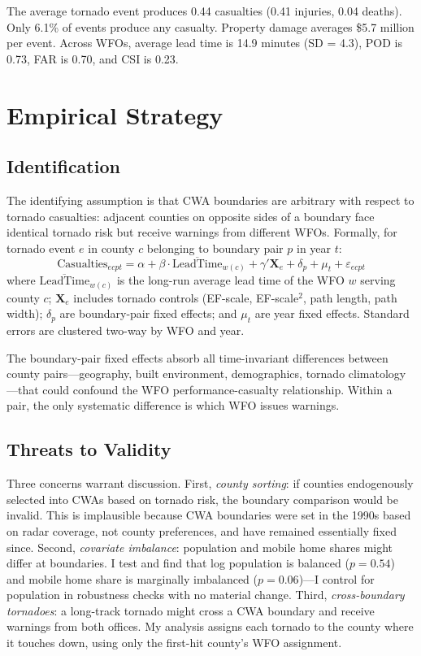 \documentclass[12pt]{article}
\begin{document}


The average tornado event produces 0.44 casualties (0.41 injuries, 0.04 deaths). Only 6.1\% of events produce any casualty. Property damage averages \$5.7 million per event. Across WFOs, average lead time is 14.9 minutes (SD = 4.3), POD is 0.73, FAR is 0.70, and CSI is 0.23.


\section{Empirical Strategy}

\subsection{Identification}

The identifying assumption is that CWA boundaries are arbitrary with respect to tornado casualties: adjacent counties on opposite sides of a boundary face identical tornado risk but receive warnings from different WFOs. Formally, for tornado event $e$ in county $c$ belonging to boundary pair $p$ in year $t$:
\begin{equation}
\text{Casualties}_{ecpt} = \alpha + \beta \cdot \overline{\text{LeadTime}}_{w(c)} + \gamma' \mathbf{X}_{e} + \delta_p + \mu_t + \varepsilon_{ecpt}
\label{eq:main}
\end{equation}
where $\overline{\text{LeadTime}}_{w(c)}$ is the long-run average lead time of the WFO $w$ serving county $c$; $\mathbf{X}_{e}$ includes tornado controls (EF-scale, EF-scale$^2$, path length, path width); $\delta_p$ are boundary-pair fixed effects; and $\mu_t$ are year fixed effects. Standard errors are clustered two-way by WFO and year.

The boundary-pair fixed effects absorb all time-invariant differences between county pairs---geography, built environment, demographics, tornado climatology---that could confound the WFO performance-casualty relationship. Within a pair, the only systematic difference is which WFO issues warnings.

\subsection{Threats to Validity}

Three concerns warrant discussion. First, \textit{county sorting}: if counties endogenously selected into CWAs based on tornado risk, the boundary comparison would be invalid. This is implausible because CWA boundaries were set in the 1990s based on radar coverage, not county preferences, and have remained essentially fixed since. Second, \textit{covariate imbalance}: population and mobile home shares might differ at boundaries. I test and find that log population is balanced ($p = 0.54$) and mobile home share is marginally imbalanced ($p = 0.06$)---I control for population in robustness checks with no material change. Third, \textit{cross-boundary tornadoes}: a long-track tornado might cross a CWA boundary and receive warnings from both offices. My analysis assigns each tornado to the county where it touches down, using only the first-hit county's WFO assignment.
\end{document}
